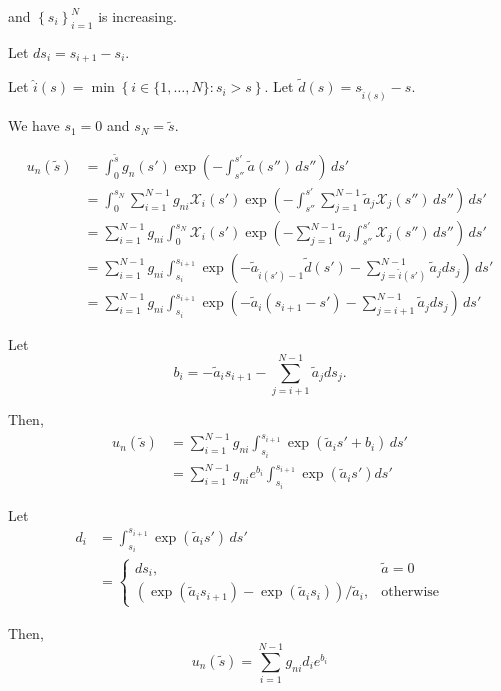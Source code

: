 and $\left\{s_i\right\}_{i=1}^N$ is increasing.

Let $ds_i = s_{i+1} - s_i$.

Let $\hat{i}(s) = \min\left\{ i \in \{1,\ldots,N\} : s_i>s \right\}$.
Let $\tilde{d}(s) = s_{\hat{i}(s)}-s$.

We have $s_1 = 0$ and $s_N = \tilde{s}$.


\begin{align}
  u_n(\tilde{s}) &= \int_0^{\tilde{s}}g_n(s')\exp\left( -\int_{s''}^{s'}\tilde{a}(s'')\,ds'' \right)\, ds' \\
  &= \int_0^{s_N} \sum_{i=1}^{N-1}g_{ni}\mathcal{X}_i(s') \exp\left( -\int_{s''}^{s'}\sum_{j=1}^{N-1}\tilde{a}_{j}\mathcal{X}_j(s'')\,ds'' \right)\, ds' \\
  &= \sum_{i=1}^{N-1}g_{ni}\int_0^{s_N} \mathcal{X}_i(s') \exp\left( -\sum_{j=1}^{N-1}\tilde{a}_{j}\int_{s''}^{s'}\mathcal{X}_j(s'')\,ds'' \right)\, ds' \\
  &= \sum_{i=1}^{N-1}g_{ni}\int_{s_i}^{s_{i+1}}  \exp\left(-\tilde{a}_{\hat{i}(s')-1}\tilde{d}(s') -\sum_{j=\hat{i}(s')}^{N-1}\tilde{a}_{j}ds_j\right)\, ds' \\
  &= \sum_{i=1}^{N-1}g_{ni}\int_{s_i}^{s_{i+1}}  \exp\left(-\tilde{a}_{i}(s_{i+1}-s') -\sum_{j=i+1}^{N-1}\tilde{a}_{j}ds_j\right)\, ds'
\end{align}

Let
\begin{equation}
  b_i = -\tilde{a}_{i}s_{i+1} - \sum_{j=i+1}^{N-1}\tilde{a}_{j}ds_j.
\end{equation}

Then,
\begin{align}
  u_n(\tilde{s}) &= \sum_{i=1}^{N-1}g_{ni}\int_{s_i}^{s_{i+1}}  \exp\left(\tilde{a}_{i}s' + b_i\right)\, ds' \\
                 &= \sum_{i=1}^{N-1}g_{ni}e^{b_i}\int_{s_i}^{s_{i+1}}  \exp\left(\tilde{a}_{i}s'\right) ds'
\end{align}

Let
\begin{align}
  d_i &= \int_{s_i}^{s_{i+1}}  \exp\left(\tilde{a}_{i}s'\right)\, ds' \\
    &= \begin{cases}
    ds_i, & \tilde{a} = 0 \\
      \left( \exp(\tilde{a}_i s_{i+1}) - \exp(\tilde{a}_i s_i) \right)/\tilde{a}_i, & \mbox{otherwise}
    \end{cases}
\end{align}

Then,
\begin{equation}
  u_n(\tilde{s}) = \sum_{i=1}^{N-1} g_{ni}d_i e^{b_i}
\end{equation}

